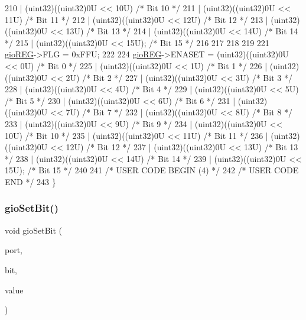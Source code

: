 \begin{DoxyCode}
210                    | (uint32)((uint32)0U << 10U)  \textcolor{comment}{/* Bit 10 */}
211                    | (uint32)((uint32)0U << 11U)  \textcolor{comment}{/* Bit 11 */}
212                    | (uint32)((uint32)0U << 12U)  \textcolor{comment}{/* Bit 12 */}
213                    | (uint32)((uint32)0U << 13U)  \textcolor{comment}{/* Bit 13 */}
214                    | (uint32)((uint32)0U << 14U)  \textcolor{comment}{/* Bit 14 */}
215                    | (uint32)((uint32)0U << 15U); \textcolor{comment}{/* Bit 15 */}
216 
217 
218 
219 
221     \mbox{\hyperlink{reg__gio_8h_acf3fc7487b247fa20e47f99b3551b8dd}{gioREG}}->FLG = 0xFFU;
222 
224     \mbox{\hyperlink{reg__gio_8h_acf3fc7487b247fa20e47f99b3551b8dd}{gioREG}}->ENASET = (uint32)((uint32)0U << 0U)   \textcolor{comment}{/* Bit 0 */}
225                    | (uint32)((uint32)0U << 1U)   \textcolor{comment}{/* Bit 1 */}
226                    | (uint32)((uint32)0U << 2U)   \textcolor{comment}{/* Bit 2 */}
227                    | (uint32)((uint32)0U << 3U)   \textcolor{comment}{/* Bit 3 */}
228                    | (uint32)((uint32)0U << 4U)   \textcolor{comment}{/* Bit 4 */}
229                    | (uint32)((uint32)0U << 5U)   \textcolor{comment}{/* Bit 5 */}
230                    | (uint32)((uint32)0U << 6U)   \textcolor{comment}{/* Bit 6 */}
231                    | (uint32)((uint32)0U << 7U)   \textcolor{comment}{/* Bit 7 */}
232                    | (uint32)((uint32)0U << 8U)   \textcolor{comment}{/* Bit 8  */}
233                    | (uint32)((uint32)0U << 9U)   \textcolor{comment}{/* Bit 9  */}
234                    | (uint32)((uint32)0U << 10U)  \textcolor{comment}{/* Bit 10 */}
235                    | (uint32)((uint32)0U << 11U)  \textcolor{comment}{/* Bit 11 */}
236                    | (uint32)((uint32)0U << 12U)  \textcolor{comment}{/* Bit 12 */}
237                    | (uint32)((uint32)0U << 13U)  \textcolor{comment}{/* Bit 13 */}
238                    | (uint32)((uint32)0U << 14U)  \textcolor{comment}{/* Bit 14 */}
239                    | (uint32)((uint32)0U << 15U); \textcolor{comment}{/* Bit 15 */}
240 
241 \textcolor{comment}{/* USER CODE BEGIN (4) */}
242 \textcolor{comment}{/* USER CODE END */}
243 \}
\end{DoxyCode}
\mbox{\label{group__GIO_ga976443b96aca877a030f1e38865f6e44}} 
\subsubsection{\texorpdfstring{gio\+Set\+Bit()}{gioSetBit()}}
{\footnotesize\ttfamily void gio\+Set\+Bit (\begin{DoxyParamCaption}\item[{\mbox{\hyperlink{reg__gio_8h_ad276ab0b3bc4719e20bc91adf2bfcfe7}{gio\+P\+O\+R\+T\+\_\+t}} $\ast$}]{port,  }\item[{uint32}]{bit,  }\item[{uint32}]{value }\end{DoxyParamCaption})}



